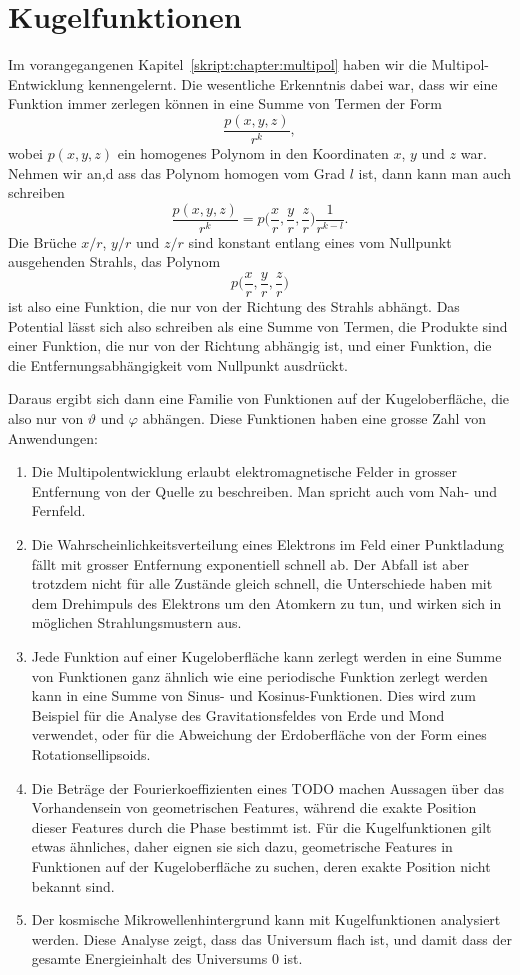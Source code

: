 %
%
%
\chapter{Kugelfunktionen%
\label{skript:chapter:kugelfunktionen}}
\rhead{}
Im vorangegangenen Kapitel~\ref{skript:chapter:multipol} haben wir
die Multipol-Entwicklung kennengelernt. 
Die wesentliche Erkenntnis dabei war, dass wir eine Funktion immer zerlegen
können in eine Summe von Termen der Form
\[
\frac{p(x,y,z)}{r^k},
\]
wobei $p(x,y,z)$ ein homogenes Polynom in den Koordinaten $x$, $y$ und
$z$ war.
Nehmen wir an,d ass das Polynom homogen vom Grad $l$ ist, dann kann man
auch schreiben
\[
\frac{p(x,y,z)}{r^k}
=
p\biggl(\frac{x}{r},\frac{y}{r},\frac{z}{r}\biggr)\frac1{r^{k-l}}.
\]
Die Brüche $x/r$, $y/r$ und $z/r$ sind konstant entlang eines vom
Nullpunkt ausgehenden Strahls, das Polynom 
\[
p\biggl(\frac{x}{r},\frac{y}{r},\frac{z}{r}\biggr)
\]
ist also eine Funktion, die nur von der Richtung des Strahls
abhängt.
Das Potential lässt sich also schreiben als eine Summe von Termen,
die Produkte sind einer Funktion, die nur von der Richtung abhängig
ist, und einer Funktion, die die Entfernungsabhängigkeit vom Nullpunkt
ausdrückt.

Daraus ergibt sich dann eine Familie von Funktionen auf der Kugeloberfläche,
die also nur von $\vartheta$ und $\varphi$ abhängen.
Diese Funktionen haben eine grosse Zahl von Anwendungen:

\begin{enumerate}
\item
Die Multipolentwicklung erlaubt elektromagnetische Felder in grosser
Entfernung von der Quelle zu beschreiben.
Man spricht auch vom Nah- und Fernfeld.
\item
Die Wahrscheinlichkeitsverteilung eines Elektrons im Feld einer Punktladung
fällt mit grosser Entfernung exponentiell schnell ab.
Der Abfall ist aber trotzdem nicht für alle Zustände gleich schnell,
die Unterschiede haben mit dem Drehimpuls des Elektrons um den Atomkern
zu tun, und wirken sich in möglichen Strahlungsmustern aus.
\item
Jede Funktion auf einer Kugeloberfläche kann zerlegt werden in eine
Summe von Funktionen ganz ähnlich wie eine periodische Funktion
zerlegt werden kann in eine Summe von Sinus- und Kosinus-Funktionen.
Dies wird zum Beispiel für die Analyse des Gravitationsfeldes von
Erde und Mond verwendet, oder für die Abweichung der Erdoberfläche
von der Form eines Rotationsellipsoids.
\item 
Die Beträge der Fourierkoeffizienten eines TODO machen Aussagen
über das Vorhandensein von geometrischen Features, während die exakte
Position dieser Features durch die Phase bestimmt ist.
Für die Kugelfunktionen gilt etwas ähnliches, daher eignen sie
sich dazu, geometrische Features in Funktionen auf der Kugeloberfläche
zu suchen, deren exakte Position nicht bekannt sind.
\item
Der kosmische Mikrowellenhintergrund kann mit Kugelfunktionen analysiert
werden.
Diese Analyse zeigt, dass das Universum flach ist, und damit dass der
gesamte Energieinhalt des Universums $0$ ist.
\end{enumerate}

